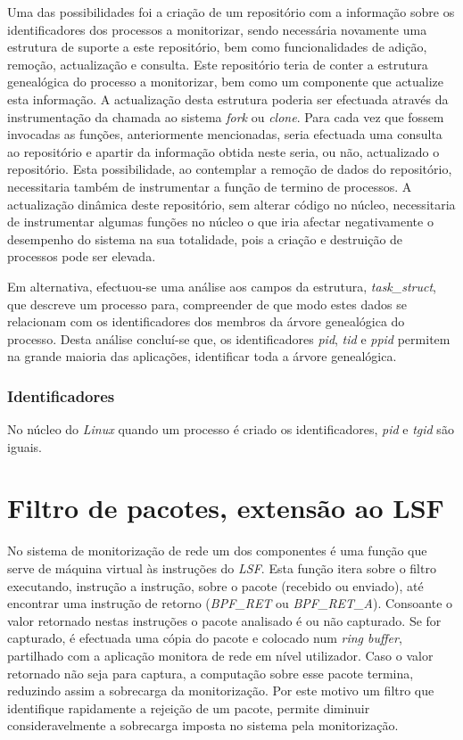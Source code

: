 Uma das possibilidades foi a criação de um repositório com a informação sobre os identificadores dos processos a monitorizar, sendo necessária novamente uma estrutura de suporte a este repositório, bem como funcionalidades de adição, remoção, actualização e consulta.
Este repositório teria de conter a estrutura genealógica do processo a monitorizar, bem como um componente que actualize esta informação.
A actualização desta estrutura poderia ser efectuada através da instrumentação da chamada ao sistema \textit{fork} ou \textit{clone}.
Para cada vez que fossem invocadas as funções, anteriormente mencionadas, seria efectuada uma consulta ao repositório e apartir da informação obtida neste seria, ou não, actualizado o repositório.
Esta possibilidade, ao contemplar a remoção de dados do repositório, necessitaria também de instrumentar a função de termino de processos.
A actualização dinâmica deste repositório, sem alterar código no núcleo, necessitaria de instrumentar algumas funções no núcleo o que iria afectar negativamente o desempenho do sistema na sua totalidade, pois a criação e destruição de processos pode ser elevada.

Em alternativa, efectuou-se uma análise aos campos da estrutura, \textit{task\_struct}, que descreve um processo para, compreender de que modo estes dados se relacionam com os identificadores dos membros da árvore genealógica do processo.
Desta análise concluí-se que, os identificadores \textit{pid}, \textit{tid} e \textit{ppid} permitem na grande maioria das aplicações, identificar toda a árvore genealógica.


\subsubsection{Identificadores}

No núcleo do \textit{Linux} quando um processo é criado os identificadores, \textit{pid} e \textit{tgid} são iguais.

\section{Filtro de pacotes, extensão ao LSF}

No sistema de monitorização de rede um dos componentes é uma função que serve de máquina virtual às instruções do \textit{LSF}.
Esta função itera sobre o filtro executando, instrução a instrução, sobre o pacote (recebido ou enviado), até encontrar uma instrução de retorno (\textit{BPF\_RET} ou \textit{BPF\_RET\_A}).
Consoante o valor retornado nestas instruções o pacote analisado é ou não capturado.
Se for capturado, é efectuada uma cópia do pacote e colocado num \textit{ring buffer}, partilhado com a aplicação monitora de rede em nível utilizador.
Caso o valor retornado não seja para captura, a computação sobre esse pacote termina, reduzindo assim a sobrecarga da monitorização.
Por este motivo um filtro que identifique rapidamente a rejeição de um pacote, permite diminuir consideravelmente a sobrecarga imposta no sistema pela monitorização.

